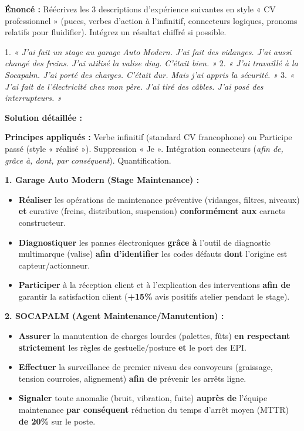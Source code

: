 \documentclass[11pt]{article}
\begin{document}
\begin{exoresolu}
    \textbf{Énoncé :} Réécrivez les 3 descriptions d'expérience suivantes en style « CV professionnel » (puces, verbes d'action à l'infinitif, connecteurs logiques, pronoms relatifs pour fluidifier). Intégrez un résultat chiffré si possible.

    1. \textit{« J'ai fait un stage au garage Auto Modern. J'ai fait des vidanges. J'ai aussi changé des freins. J'ai utilisé la valise diag. C'était bien. »}
    2. \textit{« J'ai travaillé à la Socapalm. J'ai porté des charges. C'était dur. Mais j'ai appris la sécurité. »}
    3. \textit{« J'ai fait de l'électricité chez mon père. J'ai tiré des câbles. J'ai posé des interrupteurs. »}

    \tcblower
    \textbf{Solution détaillée :}

    \textbf{Principes appliqués :} Verbe infinitif (standard CV francophone) ou Participe passé (style « réalisé »). Suppression « Je ». Intégration connecteurs (\textit{afin de, grâce à, dont, par conséquent}). Quantification.

    \textbf{1. Garage Auto Modern (Stage Maintenance) :}
    \begin{itemize}
        \item \textbf{Réaliser} les opérations de maintenance préventive (vidanges, filtres, niveaux) \textbf{et} curative (freins, distribution, suspension) \textbf{conformément aux} carnets constructeur.
        \item \textbf{Diagnostiquer} les pannes électroniques \textbf{grâce à} l'outil de diagnostic multimarque (valise) \textbf{afin d'identifier} les codes défauts \textbf{dont} l'origine est capteur/actionneur.
        \item \textbf{Participer} à la réception client et à l'explication des interventions \textbf{afin de} garantir la satisfaction client (\textbf{+15\%} avis positifs atelier pendant le stage).
    \end{itemize}

    \textbf{2. SOCAPALM (Agent Maintenance/Manutention) :}
    \begin{itemize}
        \item \textbf{Assurer} la manutention de charges lourdes (palettes, fûts) \textbf{en respectant strictement} les règles de gestuelle/posture \textbf{et} le port des EPI.
        \item \textbf{Effectuer} la surveillance de premier niveau des convoyeurs (graissage, tension courroies, alignement) \textbf{afin de} prévenir les arrêts ligne.
        \item \textbf{Signaler} toute anomalie (bruit, vibration, fuite) \textbf{auprès de} l'équipe maintenance \textbf{par conséquent} réduction du temps d'arrêt moyen (MTTR) \textbf{de 20\%} sur le poste.
    \end{itemize}


\end{exoresolu}
\end{document}
